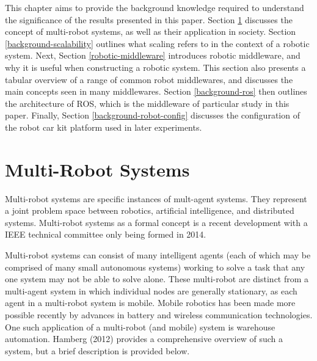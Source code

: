 \documentclass[../dissertation.tex]{subfiles}
\begin{document}
This chapter aims to provide the background knowledge required to understand the significance of the results presented in this paper. Section \ref{section-multi-robot-systems} discusses the concept of multi-robot systems, as well as their application in society. Section \ref{background-scalability} outlines what scaling refers to in the context of a robotic system. Next, Section \ref{robotic-middleware} introduces robotic middleware, and why it is useful when constructing a robotic system. This section also presents a tabular overview of a range of common robot middlewares, and discusses the main concepts seen in many middlewares. Section \ref{background-ros} then outlines the architecture of ROS, which is the middleware of particular study in this paper. Finally, Section \ref{background-robot-config} discusses the configuration of the robot car kit platform used in later experiments.

\section{Multi-Robot Systems}
\label{section-multi-robot-systems}

Multi-robot systems are specific instances of mult-agent systems. They represent a joint problem space between robotics, artificial intelligence, and distributed systems. Multi-robot systems as a formal concept is a recent development with a IEEE technical committee only being formed in 2014\cite{MultiRobotSystemsIEEECommittee}.

Multi-robot systems can consist of many intelligent agents (each of which may be comprised of many small autonomous systems) working to solve a task that any one system may not be able to solve alone. These multi-robot are distinct from a multi-agent system in which individual nodes are generally stationary, as each agent in a multi-robot system is mobile\cite{doi:10.5772/57313}. Mobile robotics has been made more possible recently by advances in battery\cite{estrin2002connecting} and wireless communication\cite{cordeiro2010ieee} technologies. One such application of a multi-robot (and mobile) system is warehouse automation. Hamberg (2012)\cite{hamberg2012automation} provides a comprehensive overview of such a system, but a brief description is provided below.
\end{document}
